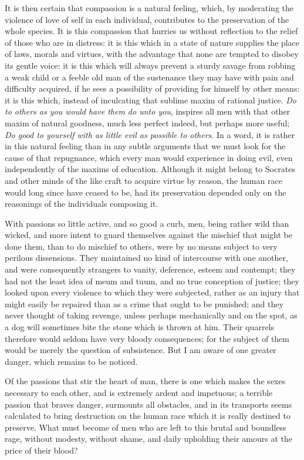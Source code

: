 \documentclass[12pt]{report}
\begin{document}
It is then certain that compassion is a natural feeling, which, by moderating the violence of love of self in each individual, contributes to the preservation of the whole species. It is this compassion that hurries us without reflection to the relief of those who are in distress: it is this which in a state of nature supplies the place of laws, morals and virtues, with the advantage that none are tempted to disobey its gentle voice: it is this which will always prevent a sturdy savage from robbing a weak child or a feeble old man of the sustenance they may have with pain and difficulty acquired, if he sees a possibility of providing for himself by other means: it is this which, instead of inculcating that sublime maxim of rational justice. \emph{Do to others as you would have them do unto you}, inspires all men with that other maxim of natural goodness, much less perfect indeed, but perhaps more useful; \emph{Do good to yourself with as little evil as possible to others}. In a word, it is rather in this natural feeling than in any subtle arguments that we must look for the cause of that repugnance, which every man would experience in doing evil, even independently of the maxims of education. Although it might belong to Socrates and other minds of the like craft to acquire virtue by reason, the human race would long since have ceased to be, had its preservation depended only on the reasonings of the individuals composing it.

With passions so little active, and so good a curb, men, being rather wild than wicked, and more intent to guard themselves against the mischief that might be done them, than to do mischief to others, were by no means subject to very perilous dissensions. They maintained no kind of intercourse with one another, and were consequently strangers to vanity, deference, esteem and contempt; they had not the least idea of meum and tuum, and no true conception of justice; they looked upon every violence to which they were subjected, rather as an injury that might easily be repaired than as a crime that ought to be punished; and they never thought of taking revenge, unless perhaps mechanically and on the spot, as a dog will sometimes bite the stone which is thrown at him. Their quarrels therefore would seldom have very bloody consequences; for the subject of them would be merely the question of subsistence. But I am aware of one greater danger, which remains to be noticed.

Of the passions that stir the heart of man, there is one which makes the sexes necessary to each other, and is extremely ardent and impetuous; a terrible passion that braves danger, surmounts all obstacles, and in its transports seems calculated to bring destruction on the human race which it is really destined to preserve. What must become of men who are left to this brutal and boundless rage, without modesty, without shame, and daily upholding their amours at the price of their blood?
\end{document}
